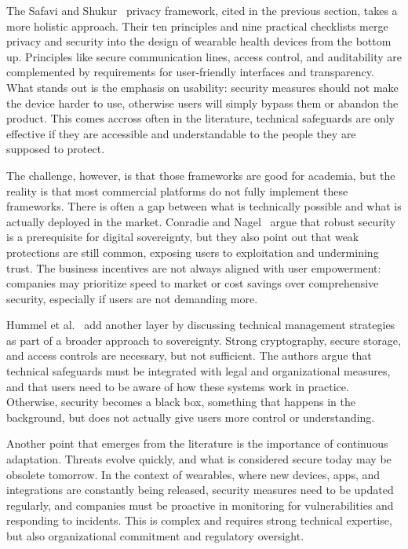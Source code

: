 	The Safavi and Shukur~\cite{Safavi2014} privacy framework, cited in the previous section, takes a more holistic approach. Their ten principles and nine practical checklists merge privacy and security into the design of wearable health devices from the bottom up. Principles like secure communication lines, access control, and auditability are complemented by requirements for user-friendly interfaces and transparency. What stands out is the emphasis on usability: security measures should not make the device harder to use, otherwise users will simply bypass them or abandon the product. This comes accross often in the literature, technical safeguards are only effective if they are accessible and understandable to the people they are supposed to protect.

	The challenge, however, is that those frameworks are good for academia, but the reality is that most commercial platforms do not fully implement these frameworks. There is often a gap between what is technically possible and what is actually deployed in the market. Conradie and Nagel~\cite{Conradie2022} argue that robust security is a prerequisite for digital sovereignty, but they also point out that weak protections are still common, exposing users to exploitation and undermining trust. The business incentives are not always aligned with user empowerment: companies may prioritize speed to market or cost savings over comprehensive security, especially if users are not demanding more.

	Hummel et al.~\cite{Hummel2021} add another layer by discussing technical management strategies as part of a broader approach to sovereignty. Strong cryptography, secure storage, and access controls are necessary, but not sufficient. The authors argue that technical safeguards must be integrated with legal and organizational measures, and that users need to be aware of how these systems work in practice. Otherwise, security becomes a black box, something that happens in the background, but does not actually give users more control or understanding.

	Another point that emerges from the literature is the importance of continuous adaptation. Threats evolve quickly, and what is considered secure today may be obsolete tomorrow. In the context of wearables, where new devices, apps, and integrations are constantly being released, security measures need to be updated regularly, and companies must be proactive in monitoring for vulnerabilities and responding to incidents. This is complex and requires strong technical expertise, but also organizational commitment and regulatory oversight.

